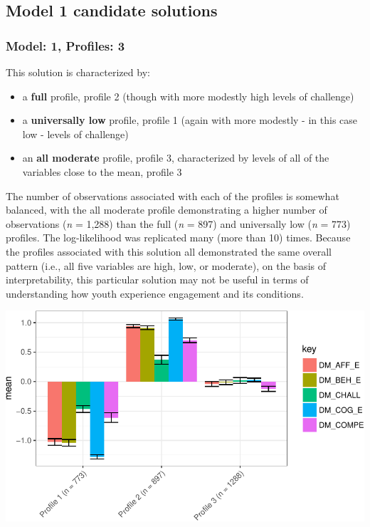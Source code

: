 \documentclass[]{book}
\providecommand{\tightlist}{%
  \setlength{\itemsep}{0pt}\setlength{\parskip}{0pt}}
\theoremstyle{definition}
\theoremstyle{definition}
\theoremstyle{definition}
\theoremstyle{remark}
\begin{document}
\subsection{Model 1 candidate
solutions}\label{model-1-candidate-solutions}

\subsubsection{Model: 1, Profiles: 3}\label{model-1-profiles-3}

This solution is characterized by:

\begin{itemize}
\tightlist
\item
  a \textbf{full} profile, profile 2 (though with more modestly high
  levels of challenge)
\item
  a \textbf{universally low} profile, profile 1 (again with more
  modestly - in this case low - levels of challenge)
\item
  an \textbf{all moderate} profile, profile 3, characterized by levels
  of all of the variables close to the mean, profile 3
\end{itemize}

The number of observations associated with each of the profiles is
somewhat balanced, with the all moderate profile demonstrating a higher
number of observations (\emph{n} = 1,288) than the full (\emph{n} = 897)
and universally low (\emph{n} = 773) profiles. The log-likelihood was
replicated many (more than 10) times. Because the profiles associated
with this solution all demonstrated the same overall pattern (i.e., all
five variables are high, low, or moderate), on the basis of
interpretability, this particular solution may not be useful in terms of
understanding how youth experience engagement and its conditions.

\begin{center}\includegraphics[width=0.8\linewidth]{rosenberg-dissertation_files/figure-latex/m1_3p-1} \end{center}
\end{document}

